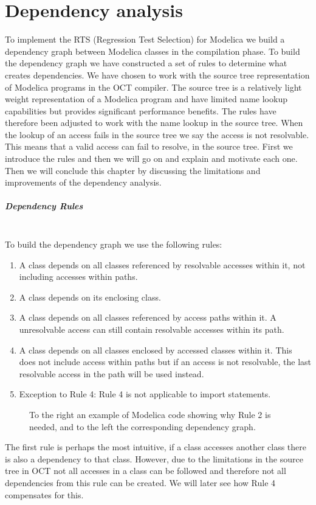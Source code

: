 \documentclass{cslthse-msc}
\begin{document}
\chapter[Dependency analysis]{Dependency analysis}
To implement the RTS (Regression Test Selection) for Modelica we build a dependency graph between Modelica classes in the compilation phase. To build the dependency graph we have constructed a set of rules to determine what creates dependencies. We have chosen to work with the source tree representation of Modelica programs in the OCT compiler. The source tree is a relatively light weight representation of a Modelica program and have limited name lookup capabilities but provides significant performance benefits. The rules have therefore been adjusted to work with the name lookup in the source tree. When the lookup of an access fails in the source tree we say the access is not resolvable. This means that a valid access can fail to resolve, in the source tree. First we introduce the rules and then we will go on and explain and motivate each one. Then we will conclude this chapter by discussing the limitations and improvements of the dependency analysis.

\paragraph{Dependency Rules}\mbox{}\\
To build the dependency graph we use the following rules:
\begin{enumerate}
\item A class depends on all classes referenced by resolvable accesses within it, not including accesses within paths.
\item A class depends on its enclosing class. 
\item A class depends on all classes referenced by access paths within it. A unresolvable access can still contain resolvable accesses within its path.
\item A class depends on all classes enclosed by accessed classes within it. This does not include access within paths but if an access is not resolvable, the last resolvable access in the path will be used instead.
\item Exception to Rule 4: Rule 4 is not applicable to import statements.
\end{enumerate}


\begin{figure}[!htbp]
    \centering
    \qquad
    \subfloat{\raisebox{3.2 cm}{}}
    \caption{To the right an example of Modelica code showing why Rule 2 is needed, and to the left the corresponding dependency graph.}
    \label{fig:parentGraph}
\end{figure}
The first rule is perhaps the most intuitive, if a class accesses another class there is also a dependency to that class. However, due to the limitations in the source tree in OCT not all accesses in a class can be followed and therefore not all dependencies from this rule can be created. We will later see how Rule 4 compensates for this. 
\end{document}
